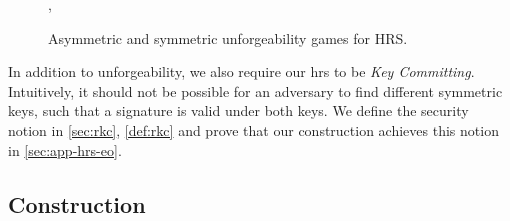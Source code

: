 \begin{figure}[!tbp]
\begin{gamebox}{\ahrsufcma, \shrsufcma}
{\begin{minipage}[t]{0.6\linewidth}
    \end{minipage}}\hfill{}\hfill{}
  \end{gamebox}
  \caption{Asymmetric and symmetric unforgeability games for HRS.}
  \label{fig:ersufcma}
\end{figure}

In addition to unforgeability, we also require our \acl{hrs} to be \emph{Key Committing}. Intuitively, it should not be
possible for an adversary to find different symmetric keys, such that a signature is valid under both keys. We define
the security notion in \cref{sec:rkc}, \cref{def:rkc} and prove that our construction achieves this notion in \cref{sec:app-hrs-eo}.

\subsection{Construction}\label{sec:red_sig}
